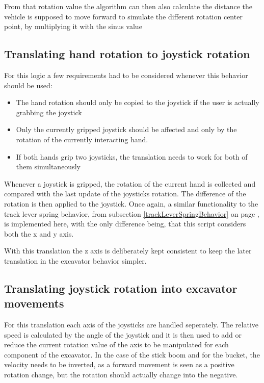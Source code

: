 \documentclass[journal]{vgtc}                     %
\begin{document}
From that rotation value the algorithm can then also calculate the distance the vehicle is supposed to move forward to simulate the different rotation center point, by multiplying it with the sinus value

\subsection{Translating hand rotation to joystick rotation}

For this logic a few requirements had to be considered whenever this behavior should be used:

\begin{itemize}
  \item The hand rotation should only be copied to the joystick if the user is actually grabbing the joystick
  \item Only the currently gripped joystick should be affected and only by the rotation of the currently interacting hand.
  \item If both hands grip two joysticks, the translation needs to work for both of them simultaneously
\end{itemize}

Whenever a joystick is gripped, the rotation of the current hand is collected and compared with the last update of the joysticks rotation. The difference of the rotation is then applied to the joystick. Once again, a similar functionality to the track lever spring behavior, from subsection \ref{trackLeverSpringBehavior} on page \pageref{trackLeverSpringBehavior}, is implemented here, with the only difference being, that this script considers both the x and y axis.

With this translation the z axis  is deliberately kept consistent to keep the later translation in the excavator behavior simpler.

\subsection{Translating joystick rotation into excavator movements}

For this translation each axis of the joysticks are handled seperately. The relative speed is calculated by the angle of the joystick and it is then used to add or reduce the current rotation value of the axis to be manipulated for each component of the excavator. In the case of the stick boom and for the bucket, the velocity needs to be inverted, as a forward movement is seen as a positive rotation change, but the rotation should actually change into the negative.
\end{document}
